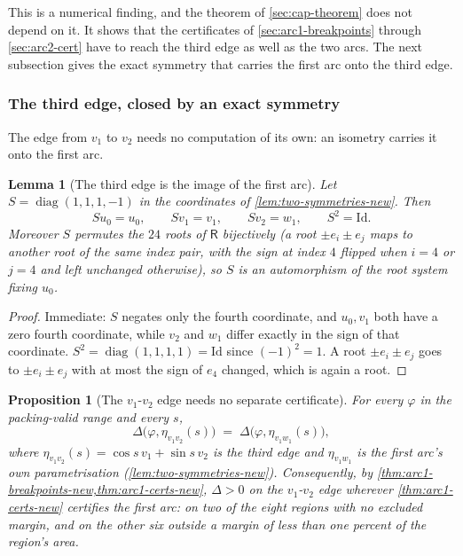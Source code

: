\documentclass[11pt,reqno]{amsart}
\renewcommand{\_}{\origunderscore\allowbreak}
\numberwithin{equation}{section}
\theoremstyle{plain}
\newtheorem{prop}[thm]{Proposition}
\newtheorem{lem}[thm]{Lemma}
\theoremstyle{definition}
\theoremstyle{remark}
\newcommand{\Rt}{\mathsf{R}}                 %
\newcommand{\tilt}{\varphi}                  %
\newcommand{\arcp}{s}                        %
\newcommand{\dev}{\eta}                      %
\newcommand{\defect}{\Delta}                 %
\DeclareMathOperator{\diag}{diag}
\begin{document}
This is a numerical finding, and the theorem of \cref{sec:cap-theorem}
does not depend on it. It shows that the certificates of
\cref{sec:arc1-breakpoints} through \cref{sec:arc2-cert} have to reach
the third edge as well as the two arcs. The next subsection gives the
exact symmetry that carries the first arc onto the third edge.

\subsubsection{The third edge, closed by an exact symmetry}\label{sec:third-edge-closed}

The edge from $v_1$ to $v_2$ needs no computation of its own: an
isometry carries it onto the first arc.

\begin{lem}[The third edge is the image of the first arc]\label{lem:third-edge-symmetry}
Let $S=\diag(1,1,1,-1)$ in the coordinates of
\cref{lem:two-symmetries-new}. Then
\[
  S u_0=u_0,\qquad S v_1=v_1,\qquad S v_2=w_1,\qquad S^2=\mathrm{Id}.
\]
Moreover $S$ permutes the $24$ roots of $\Rt$ bijectively (a root
$\pm e_i\pm e_j$ maps to another root of the same index pair, with the
sign at index $4$ flipped when $i=4$ or $j=4$ and left unchanged
otherwise), so $S$ is an automorphism of the root system fixing $u_0$.
\end{lem}

\begin{proof}
Immediate: $S$ negates only the fourth coordinate, and $u_0,v_1$ both
have a zero fourth coordinate, while $v_2$ and $w_1$ differ exactly in
the sign of that coordinate. $S^2=\diag(1,1,1,1)=\mathrm{Id}$ since
$(-1)^2=1$. A root $\pm e_i\pm e_j$ goes to $\pm e_i\pm e_j$ with at
most the sign of $e_4$ changed, which is again a root.
\end{proof}

\begin{prop}[The $v_1$-$v_2$ edge needs no separate certificate]\label{prop:third-edge-cert}
For every $\tilt$ in the packing-valid range and every $\arcp$,
\[
  \defect\bigl(\tilt,\dev_{v_1v_2}(\arcp)\bigr) \;=\;
  \defect\bigl(\tilt,\dev_{v_1w_1}(\arcp)\bigr),
\]
where $\dev_{v_1v_2}(\arcp)=\cos\arcp\,v_1+\sin\arcp\,v_2$ is the third
edge and $\dev_{v_1w_1}$ is the first arc's own parametrisation
(\cref{lem:two-symmetries-new}). Consequently, by
\cref{thm:arc1-breakpoints-new,thm:arc1-certs-new}, $\defect>0$ on the
$v_1$-$v_2$ edge wherever \cref{thm:arc1-certs-new} certifies the first
arc: on two of the eight regions with no excluded margin, and on the
other six outside a margin of less than one percent of the region's
area.
\end{prop}
\end{document}

